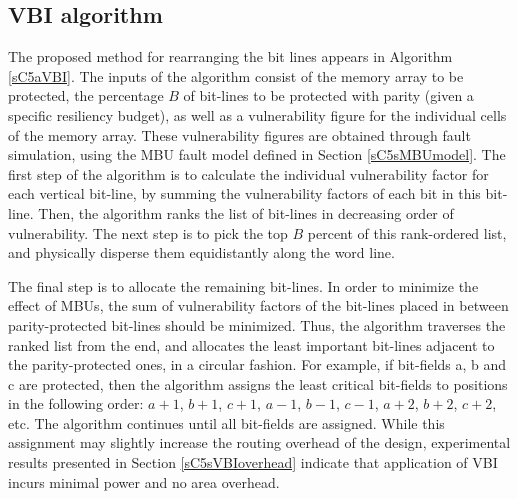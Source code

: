 \documentclass[12pt]{yalephd}
\begin{document}
\subsection{VBI algorithm}\label{sC5sVBIalgo}

The proposed method for rearranging the bit lines appears in Algorithm \ref{sC5aVBI}. The inputs of the algorithm consist of the memory array to be protected, the percentage $B$ of bit-lines to be protected with parity (given a specific resiliency budget), as well as a vulnerability figure for the individual cells of the memory array. These vulnerability figures are obtained through fault simulation, using the MBU fault model defined in Section \ref{sC5sMBUmodel}. The first step of the algorithm is to calculate the individual vulnerability factor for each vertical bit-line, by summing the vulnerability factors of each bit in this bit-line. Then, the algorithm ranks the list of bit-lines in decreasing order of vulnerability. The next step is to pick the top $B$ percent of this rank-ordered list, and physically disperse them equidistantly along the word line.

The final step is to allocate the remaining bit-lines. In order to minimize the effect of MBUs, the sum of vulnerability factors of the bit-lines placed in between parity-protected bit-lines should be minimized. Thus, the algorithm traverses the ranked list from the end, and allocates the least important bit-lines adjacent to the parity-protected ones, in a circular fashion. For example, if bit-fields a, b and c are protected, then the algorithm assigns the least critical bit-fields to positions in the following order: $a+1$, $b+1$, $c+1$, $a-1$, $b-1$, $c-1$, $a+2$, $b+2$, $c+2$, etc. The algorithm continues until all bit-fields are assigned. While this assignment may slightly increase the routing overhead of the design, experimental results presented in Section \ref{sC5sVBIoverhead} indicate that application of VBI incurs minimal power and no area overhead.
\end{document}
